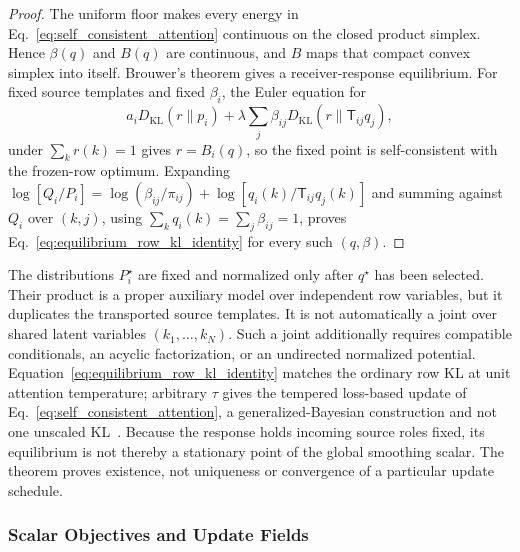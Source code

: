 \begin{proof}
The uniform floor makes every energy in Eq.~\eqref{eq:self_consistent_attention} continuous on the closed product simplex. Hence $\beta(q)$ and $B(q)$ are continuous, and $B$ maps that compact convex simplex into itself. Brouwer's theorem gives a receiver-response equilibrium. For fixed source templates and fixed $\beta_i$, the Euler equation for
\begin{equation}
a_iD_{\mathrm{KL}}(r\|p_i)
+\lambda\sum_j\beta_{ij}D_{\mathrm{KL}}(r\|\mathsf{T}_{ij}q_j),
\label{eq:frozen_row_geometric_pool_objective}
\end{equation}
under $\sum_k r(k)=1$ gives $r=B_i(q)$, so the fixed point is self-consistent with the frozen-row optimum. Expanding $\log[Q_i/P_i]=\log(\beta_{ij}/\pi_{ij})+\log[q_i(k)/\mathsf{T}_{ij}q_j(k)]$ and summing against $Q_i$ over $(k,j)$, using $\sum_kq_i(k)=\sum_j\beta_{ij}=1$, proves Eq.~\eqref{eq:equilibrium_row_kl_identity} for every such $(q,\beta)$.
\end{proof}

\begin{remark}
\label{rem:equilibrium_model_scope}
The distributions $P_i^\star$ are fixed and normalized only after $q^\star$ has been selected. Their product is a proper auxiliary model over independent row variables, but it duplicates the transported source templates. It is not automatically a joint over shared latent variables $(k_1,\ldots,k_N)$. Such a joint additionally requires compatible conditionals, an acyclic factorization, or an undirected normalized potential. Equation~\eqref{eq:equilibrium_row_kl_identity} matches the ordinary row KL at unit attention temperature; arbitrary $\tau$ gives the tempered loss-based update of Eq.~\eqref{eq:self_consistent_attention}, a generalized-Bayesian construction and not one unscaled KL~\cite{BissiriHolmesWalker2016}. Because the response holds incoming source roles fixed, its equilibrium is not thereby a stationary point of the global smoothing scalar. The theorem proves existence, not uniqueness or convergence of a particular update schedule.
\end{remark}

\subsubsection{Scalar Objectives and Update Fields}

